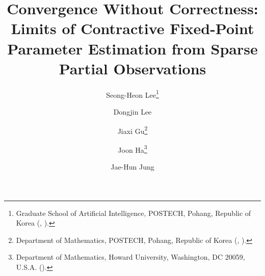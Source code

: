 

\usepackage{lipsum}
\usepackage{amsfonts}
\usepackage{graphicx}
\usepackage{caption}
\usepackage{subfig}
\usepackage{epstopdf}
\usepackage{algorithmic}
\usepackage{booktabs}
\ifpdf
\else
\fi

\usepackage{enumitem}

\usepackage{url}

\newcommand{\creflastconjunction}{, and~}

\overfullrule=0pt
\AtBeginDocument{\overfullrule=0pt}



\title{Convergence Without Correctness: Limits of Contractive Fixed-Point Parameter Estimation from Sparse Partial Observations}

\author{
  Seong-Heon Lee\thanks{Graduate School of Artificial Intelligence, POSTECH, Pohang, Republic of Korea 
    (, ).}
  \and
  Dongjin Lee\footnotemark[2]
  \and
  Jiaxi Gu\thanks{Department of Mathematics, POSTECH, Pohang, Republic of Korea 
    (, ).}
  \and
  Joon Ha\thanks{Department of Mathematics, Howard University, Washington, DC 20059, U.S.A. 
    ().}
  \and
  Jae-Hun Jung\footnotemark[3]
}

\usepackage{amsopn}
\DeclareMathOperator{\diag}{diag}




